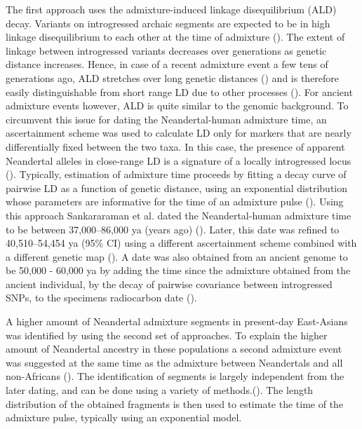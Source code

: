 \documentclass[]{article}
\begin{document}
The first approach uses the admixture-induced linkage disequilibrium
(ALD) decay. Variants on introgressed archaic segments are
expected to be in high linkage disequilibrium to each other at the time
of admixture
(\cite{chakraborty_admixture_1988,stephens_mapping_1994,wall_detecting_2000}). The extent of linkage between introgressed variants decreases over generations as genetic distance increases. Hence, in case of a recent
admixture event a few tens of generations ago, ALD stretches  over long genetic distances
(\cite{patterson_methods_2004}) and is therefore easily distinguishable
from short range LD due to other processes (\cite{moorjani_history_2011}). For ancient
admixture events however, ALD is quite similar to the genomic background. To circumvent this issue for dating the Neandertal-human admixture time, an ascertainment scheme was used to calculate LD only for markers that are nearly differentially fixed between the two taxa. In this case, the presence of apparent Neandertal alleles in close-range LD is a signature of a locally introgressed locus
(\cite{sankararaman_date_2012}). Typically, estimation of admixture time proceeds by fitting a decay curve of pairwise LD as a function of
genetic distance, using an exponential distribution whose parameters are informative for the time of an admixture pulse
(\cite{moorjani_history_2011,loh_inferring_2013}). Using this approach Sankararaman et al. dated the Neandertal-human admixture time to
be  between 37,000--86,000 ya (years ago) (\cite{sankararaman_date_2012}). Later,
this date was refined to 40,510--54,454 ya (95\% CI) using a different
ascertainment scheme combined with a different genetic map
(\cite{moorjani_genetic_2016}). A date was also obtained from an ancient
genome to be 50,000 - 60,000 ya by adding the time since the admixture obtained from the
ancient individual, by the decay of pairwise covariance between
introgressed SNPs, to the specimens radiocarbon date
(\cite{fu_genome_2014}).

A higher amount of Neandertal admixture segments in present-day East-Asians was identified by using the second set of approaches. To explain the higher amount of Neandertal ancestry in these populations a second admixture event was suggested at the same time as the admixture between Neandertals and
all non-Africans (\cite{kim_selection_2015,vernot_complex_2015}).  The identification of segments is largely independent from the later dating, and can be done using a variety of methods.(\cite{racimo_signatures_2017,seguin_orlando_paleogenomics_2014,vernot_excavating_2016,sankararaman_combined_2016,skov_detecting_2018}). The length distribution of the obtained fragments is then used to estimate the time of the admixture pulse, typically using an exponential model.
\end{document}
